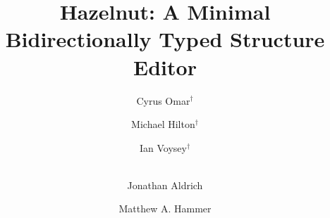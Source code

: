 \documentclass{llncs}
\begin{document}
\mainmatter              %
%
\title{Hazelnut: A Minimal Bidirectionally Typed Structure Editor}
%
%
\author{Cyrus Omar$^\dagger$ \and Michael Hilton$^\dagger$ \and
Ian Voysey$^\dagger$ \and \\Jonathan Aldrich \and Matthew A. Hammer}
%
%
%
\end{document}
